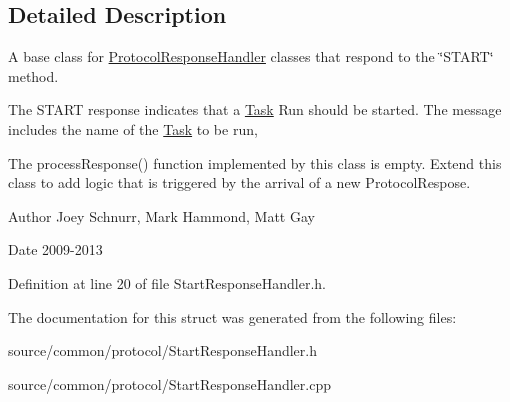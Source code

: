 \subsection{Detailed Description}
A base class for \hyperlink{struct_picto_1_1_protocol_response_handler}{Protocol\-Response\-Handler} classes that respond to the \char`\"{}\-S\-T\-A\-R\-T\char`\"{} method. 

The S\-T\-A\-R\-T response indicates that a \hyperlink{class_picto_1_1_task}{Task} Run should be started. The message includes the name of the \hyperlink{class_picto_1_1_task}{Task} to be run,

The process\-Response() function implemented by this class is empty. Extend this class to add logic that is triggered by the arrival of a new Protocol\-Respose. \begin{DoxyAuthor}{Author}
Joey Schnurr, Mark Hammond, Matt Gay 
\end{DoxyAuthor}
\begin{DoxyDate}{Date}
2009-\/2013 
\end{DoxyDate}


Definition at line 20 of file Start\-Response\-Handler.\-h.



The documentation for this struct was generated from the following files\-:\begin{DoxyCompactItemize}
\item 
source/common/protocol/Start\-Response\-Handler.\-h\item 
source/common/protocol/Start\-Response\-Handler.\-cpp\end{DoxyCompactItemize}
